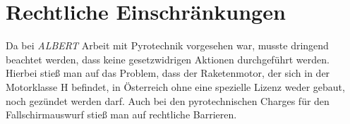 \section{Rechtliche Einschränkungen}
\label{sec:legal_boundaries}

Da bei \textit{ALBERT} Arbeit mit Pyrotechnik vorgesehen war, musste dringend beachtet werden, dass keine gesetzwidrigen Aktionen durchgeführt werden. Hierbei stieß man auf das Problem, dass der Raketenmotor, der sich in der Motorklasse H befindet, in Österreich ohne eine spezielle Lizenz weder gebaut, noch gezündet werden darf. Auch bei den pyrotechnischen Charges für den Fallschirmauswurf stieß man auf rechtliche Barrieren.

